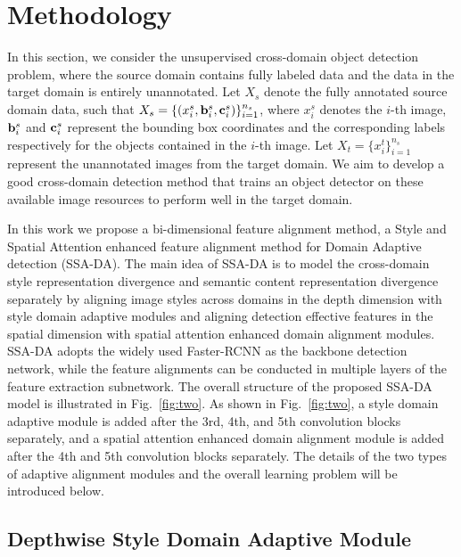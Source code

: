 \documentclass[runningheads]{llncs}
\begin{document}
\section{Methodology}
In this section, 
we consider the unsupervised cross-domain object detection problem, 
where the source domain contains fully labeled data
and the data in the target domain is entirely unannotated.
Let $X_s$ denote the fully annotated source domain data, such that $X_s=\{(x_i^s, {\bf b}_i^s, {\bf c}_i^s)\}_{i = 1}^{{n_s}}$, 
where $x_i^s$ denotes the $i$-th image, ${\bf b}_i^s$ and ${\bf c}_i^s$ represent the bounding box coordinates and the corresponding labels respectively for 
the objects contained in the $i$-th image. 
Let $X_t=\{x_i^t\}_{i = 1}^{{n_s}}$ represent the unannotated images from the target domain. 
We aim to develop a good cross-domain detection method
that trains an object detector on these available image resources 
to perform well in the target domain.


In this work we propose a bi-dimensional feature alignment method, 
a Style and Spatial Attention enhanced feature alignment method for Domain Adaptive detection (SSA-DA).
The main idea of SSA-DA is to model the cross-domain style representation divergence and
semantic content representation divergence separately by
aligning image styles across domains in the depth dimension 
with style domain adaptive modules
and aligning detection effective features in the spatial dimension with spatial attention enhanced domain alignment modules. 
SSA-DA adopts the widely used Faster-RCNN as the backbone detection network, while
the feature alignments can be conducted in multiple layers of the feature extraction subnetwork. 
The overall structure of the proposed SSA-DA model is illustrated in Fig.~\ref{fig:two}.
As shown in Fig.~\ref{fig:two}, a style domain adaptive module is 
added after the 3rd, 4th, and 5th convolution blocks separately,
and a spatial attention enhanced domain alignment module is added
after the 4th and 5th convolution blocks separately.
The details of the two types of adaptive alignment modules 
and the overall learning problem will be introduced below.


\subsection{Depthwise Style Domain Adaptive Module}\label{section:style}
\end{document}

